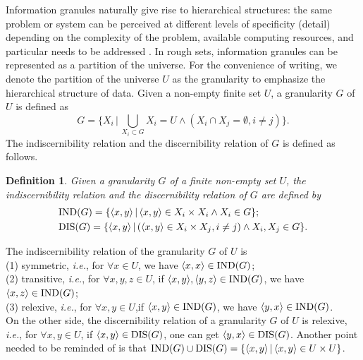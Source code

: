 \documentclass[review]{elsarticle}
\newtheorem{myDef}{Definition}
\begin{document}
		\par Information granules naturally give rise to hierarchical structures: the same problem or system can be perceived at different levels of specificity (detail) depending on the complexity of the problem, available computing resources, and particular needs to be addressed \cite{PedryczGranular}. In rough sets, information granules can be represented as a partition of the universe. For the convenience of writing, we denote the partition of the universe $U$ as the granularity to emphasize the hierarchical structure of data. Given a non-empty finite set $U$, a granularity $G$ of $U$ is defined as
		\begin{equation*}G= \{X_i\,|\,\bigcup_{X_i \subset G} X_i=U \wedge(X_i \cap X_j=\emptyset,i \neq j)  \}.\end{equation*}
		The indiscernibility relation and the discernibility relation of $G$ is defined as follows.
		\begin{myDef}
			Given a granularity $G$ of a finite non-empty set $U$, the indiscernibility relation and the discernibility relation of $G$ are defined by
			\begin{equation*}
			\begin{aligned}
			&{\rm IND}(G)=\{\langle x,y\rangle \,|\,\langle x,y\rangle \in X_i \times X_i \wedge X_i \in G\};\\
			&{\rm DIS}(G)=\{\langle x,y\rangle \,|\,(\langle x,y\rangle \in X_i \times X_j,i \neq j)\wedge X_i,X_j \in G\}.
			\end{aligned}
			\end{equation*}
		\end{myDef}
		\noindent The indiscernibility relation of the granularity $G$ of $U$ is
			\\{\rm(1)} symmetric, \emph{i.e.}, for $\forall x \in U$, we have $\langle x,x\rangle \in {\rm IND}(G)$;
			\\{\rm(2)} transitive, \emph{i.e.}, for $\forall x,y,z \in U$, if $\langle x,y\rangle ,\langle y,z\rangle  \in {\rm IND}(G)$, we have $\langle x,z\rangle  \in {\rm IND}(G)$;
			\\{\rm(3)} relexive, \emph{i.e.}, for $\forall x,y \in U$,if $\langle x,y\rangle  \in {\rm IND}(G)$, we have $\langle y,x\rangle  \in {\rm IND}(G)$.\\
		On the other side, the discernibility relation of a granularity $G$ of $U$ is relexive, \emph{i.e.}, for $\forall x,y \in U$, if $\langle x,y\rangle  \in {\rm DIS}(G)$, one can get $\langle y,x\rangle  \in {\rm DIS}(G)$.
		Another point needed to be reminded of is that ${\rm IND}(G) \cup {\rm DIS}(G) = \{\langle x,y\rangle \,|\,\langle x,y\rangle \in U \times U\}$.
\end{document}
